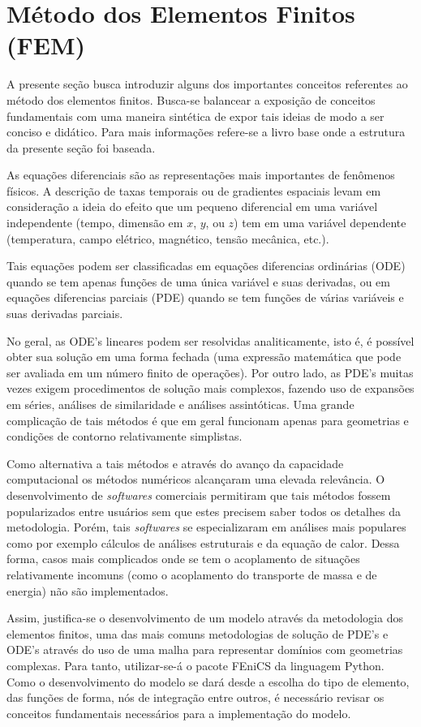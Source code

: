 \section{Método dos Elementos Finitos (FEM)}\label{fem}
A presente seção busca introduzir alguns dos importantes conceitos referentes ao
método dos elementos finitos. Busca-se balancear a exposição de conceitos
fundamentais com uma maneira sintética de expor tais ideias de modo a ser
conciso e didático. Para mais informações refere-se a \cite{langtangen2017}
livro base onde a estrutura da presente seção foi baseada.

As equações diferenciais são as representações mais importantes de fenômenos
físicos. A descrição de taxas temporais ou de gradientes espaciais levam em
consideração a ideia do efeito que um pequeno diferencial em uma variável
independente (tempo, dimensão em $x$, $y$, ou $z$) tem em uma variável
dependente (temperatura, campo elétrico, magnético, tensão mecânica, etc.).

Tais equações podem ser classificadas em equações diferencias ordinárias (ODE)
quando se tem apenas funções de uma única variável e suas derivadas, ou em
equações diferencias parciais (PDE) quando se tem funções de várias variáveis e
suas derivadas parciais.

No geral, as ODE's lineares podem ser resolvidas analiticamente, isto é, é
possível obter sua solução em uma forma fechada (uma expressão matemática que
pode ser avaliada em um número finito de operações). Por outro lado, as PDE's
muitas vezes exigem procedimentos de solução mais complexos, fazendo uso de
expansões em séries, análises de similaridade e análises assintóticas. Uma grande
complicação de tais métodos é que em geral funcionam apenas para geometrias e
condições de contorno relativamente simplistas.

Como alternativa a tais métodos e através do avanço da capacidade computacional
os métodos numéricos alcançaram uma elevada relevância. O desenvolvimento de
\textit{softwares} comerciais permitiram que tais métodos fossem popularizados
entre usuários sem que estes precisem saber todos os detalhes da metodologia.
Porém, tais \textit{softwares} se especializaram em análises mais populares como
por exemplo cálculos de análises estruturais e da equação de calor. Dessa forma, casos mais
complicados onde se tem o acoplamento de situações relativamente incomuns (como
o acoplamento do transporte de massa e de energia) não são implementados.

Assim, justifica-se o desenvolvimento de um modelo através da metodologia dos
elementos finitos, uma das mais comuns metodologias de solução de PDE's e ODE's
através do uso de uma malha para representar domínios com geometrias complexas.
Para tanto, utilizar-se-á o pacote FEniCS da linguagem Python. Como o
desenvolvimento do modelo se dará desde a escolha do tipo de elemento, das
funções de forma, nós de integração entre outros, é necessário revisar os
conceitos fundamentais necessários para a implementação do modelo.

